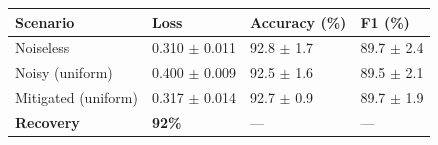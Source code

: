 \begin{tabular}{llll}
\toprule
Scenario & Loss & Accuracy (\%) & F1 (\%) \\
\midrule
Noiseless & 0.310 $\pm$ 0.011 & 92.8 $\pm$ 1.7 & 89.7 $\pm$ 2.4 \\
Noisy (uniform) & 0.400 $\pm$ 0.009 & 92.5 $\pm$ 1.6 & 89.5 $\pm$ 2.1 \\
Mitigated (uniform) & 0.317 $\pm$ 0.014 & 92.7 $\pm$ 0.9 & 89.7 $\pm$ 1.9 \\
\textbf{Recovery} & \textbf{92\%} & --- & --- \\
\bottomrule
\end{tabular}
